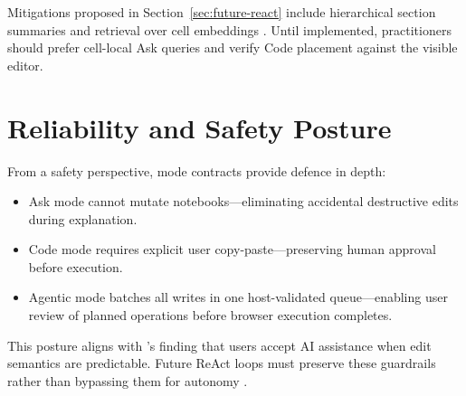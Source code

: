 Mitigations proposed in Section~\ref{sec:future-react} include hierarchical section summaries and retrieval over cell embeddings \parencite{lewis2020rag,jiang2023structgpt}. Until implemented, practitioners should prefer cell-local Ask queries and verify Code placement against the visible editor.

\section{Reliability and Safety Posture}
\label{sec:safety}

From a safety perspective, mode contracts provide defence in depth:

\begin{itemize}
  \item Ask mode cannot mutate notebooks---eliminating accidental destructive edits during explanation.
  \item Code mode requires explicit user copy-paste---preserving human approval before execution.
  \item Agentic mode batches all writes in one host-validated queue---enabling user review of planned operations before browser execution completes.
\end{itemize}

This posture aligns with \textcite{mozannar2024reading}'s finding that users accept AI assistance when edit semantics are predictable. Future ReAct loops must preserve these guardrails rather than bypassing them for autonomy \parencite{shinn2023reflexion}.
